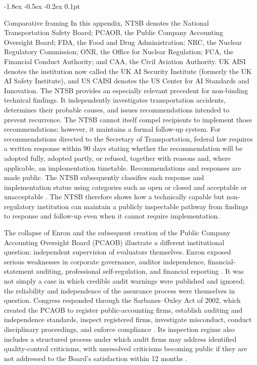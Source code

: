 \documentclass{article}
\makeatletter
\renewcommand{\subsection}{%
  \@startsection{subsection}{2}{\z@}%
                {-1.8ex \@plus -0.5ex \@minus -0.2ex}%
                {0.1pt}%
                {\normalsize\bf\raggedright}%
}
\makeatother
\begin{document}
\subsection{Comparative framing}
In this appendix, NTSB denotes the National Transportation Safety Board; PCAOB, the Public Company Accounting Oversight Board; FDA, the Food and Drug Administration; NRC, the Nuclear Regulatory Commission; ONR, the Office for Nuclear Regulation; FCA, the Financial Conduct Authority; and CAA, the Civil Aviation Authority. UK AISI denotes the institution now called the UK AI Security Institute (formerly the UK AI Safety Institute), and US CAISI denotes the US Center for AI Standards and Innovation.
The NTSB provides an especially relevant precedent for non-binding technical findings. It independently investigates transportation accidents, determines their probable causes, and issues recommendations intended to prevent recurrence. The NTSB cannot itself compel recipients to implement those recommendations; however, it maintains a formal follow-up system. For recommendations directed to the Secretary of Transportation, federal law requires a written response within 90 days stating whether the recommendation will be adopted fully, adopted partly, or refused, together with reasons and, where applicable, an implementation timetable. Recommendations and responses are made public. The NTSB subsequently classifies each response and implementation status using categories such as open or closed and acceptable or unacceptable \citep{uscode1135,ntsb2024}. The NTSB therefore shows how a technically capable but non-regulatory institution can maintain a publicly inspectable pathway from findings to response and follow-up even when it cannot require implementation.

The collapse of Enron and the subsequent creation of the Public Company Accounting Oversight Board (PCAOB) illustrate a different institutional question: independent supervision of evaluators themselves. Enron exposed serious weaknesses in corporate governance, auditor independence, financial-statement auditing, professional self-regulation, and financial reporting \citep{gao2002}. It was not simply a case in which credible audit warnings were published and ignored; the reliability and independence of the assurance process were themselves in question. Congress responded through the Sarbanes--Oxley Act of 2002, which created the PCAOB to register public-accounting firms, establish auditing and independence standards, inspect registered firms, investigate misconduct, conduct disciplinary proceedings, and enforce compliance \citep{sec2003}. Its inspection regime also includes a structured process under which audit firms may address identified quality-control criticisms, with unresolved criticisms becoming public if they are not addressed to the Board's satisfaction within 12 months \citep{pcaob2013}.
\end{document}
